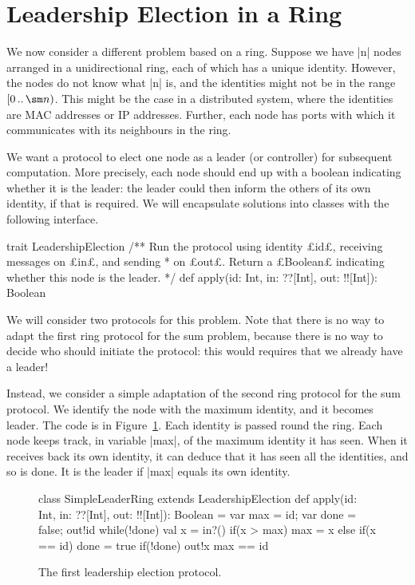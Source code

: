\section{Leadership Election in a Ring}

We now consider a different problem based on a ring.  Suppose we have |n|
nodes arranged in a unidirectional ring, each of which has a unique identity.
However, the nodes do not know what |n| is, and the identities might not be in
the range $\interval{0}{\sm n}$.  This might be the case in a distributed
system, where the identities are MAC addresses or IP addresses.  Further, each
node has ports with which it communicates with its neighbours in the ring.

We want a protocol to elect one node as a leader (or controller) for
subsequent computation.  More precisely, each node should end up with a
boolean indicating whether it is the leader: the leader could then inform the
others of its own identity, if that is required.  We will encapsulate
solutions into classes with the following interface.
%
\begin{scala}
trait LeadershipElection{
  /** Run the protocol using identity £id£, receiving messages on £in£, and sending 
    * on £out£.  Return a £Boolean£ indicating whether this node is the leader. */
  def apply(id: Int, in: ??[Int], out: !![Int]): Boolean
}
\end{scala}
%

We will consider two protocols for this problem. 
Note that there is no way to adapt the first ring protocol for the sum
problem, because there is no way to decide who should initiate the protocol:
this would requires that we already have a leader! 


Instead, we consider a simple adaptation of the second ring protocol for the
sum protocol.  We identify the node with the maximum identity, and it becomes
leader.  The code is in Figure~\ref{fig:leadership1}.  Each identity is passed
round the ring.  Each node keeps track, in variable |max|, of the maximum
identity it has seen.  When it receives back its own identity, it can deduce
that it has seen all the identities, and so is done.  It is the leader if
|max| equals its own identity.


\begin{figure}[htbp]
\begin{scala}
class SimpleLeaderRing extends LeadershipElection{
  def apply(id: Int, in: ??[Int], out: !![Int]): Boolean = {
    var max = id; var done = false; out!id
    while(!done){
      val x = in?()
      if(x > max) max = x
      else if(x == id) done = true
      if(!done) out!x    
    }
    max == id
  }
}
\end{scala}
\caption{The first leadership election protocol.}
\label{fig:leadership1}
\end{figure}

